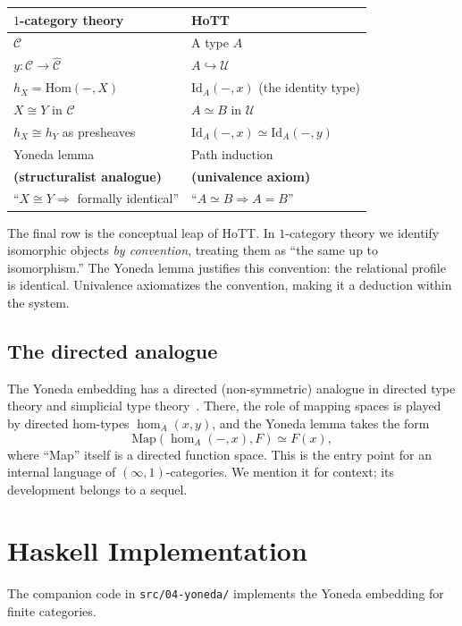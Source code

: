\documentclass[12pt]{article}
\theoremstyle{definition}
\theoremstyle{remark}
\begin{document}
\begin{center}
\begin{tabular}{l|l}
\textbf{$1$-category theory} & \textbf{HoTT} \\
\hline
$\mathcal{C}$ & A type $A$ \\
$y\colon \mathcal{C} \to \widehat{\mathcal{C}}$ & $A \hookrightarrow \mathcal{U}$ \\
$h_X = \mathrm{Hom}(-, X)$ & $\mathrm{Id}_A(-, x)$ (the identity type) \\
$X \cong Y$ in $\mathcal{C}$ & $A \simeq B$ in $\mathcal{U}$ \\
$h_X \cong h_Y$ as presheaves & $\mathrm{Id}_A(-, x) \simeq \mathrm{Id}_A(-, y)$ \\
Yoneda lemma & Path induction \\
\textbf{(structuralist analogue)} & \textbf{(univalence axiom)} \\
``$X \cong Y \Rightarrow$ formally identical'' & ``$A \simeq B \Rightarrow A = B$''
\end{tabular}
\end{center}

The final row is the conceptual leap of HoTT. In $1$-category theory we identify isomorphic objects \emph{by convention}, treating them as ``the same up to isomorphism.'' The Yoneda lemma justifies this convention: the relational profile is identical. Univalence axiomatizes the convention, making it a deduction within the system.

\subsection{The directed analogue}

The Yoneda embedding has a directed (non-symmetric) analogue in directed type theory and simplicial type theory~\cite{riehl-shulman}. There, the role of mapping spaces is played by directed hom-types $\hom_A(x, y)$, and the Yoneda lemma takes the form
\[
\mathrm{Map}(\hom_A(-, x), F) \simeq F(x),
\]
where ``Map'' itself is a directed function space. This is the entry point for an internal language of $(\infty, 1)$-categories. We mention it for context; its development belongs to a sequel.

\section{Haskell Implementation}
\label{sec:haskell}

The companion code in \texttt{src/04-yoneda/} implements the Yoneda embedding for finite categories.
\end{document}
